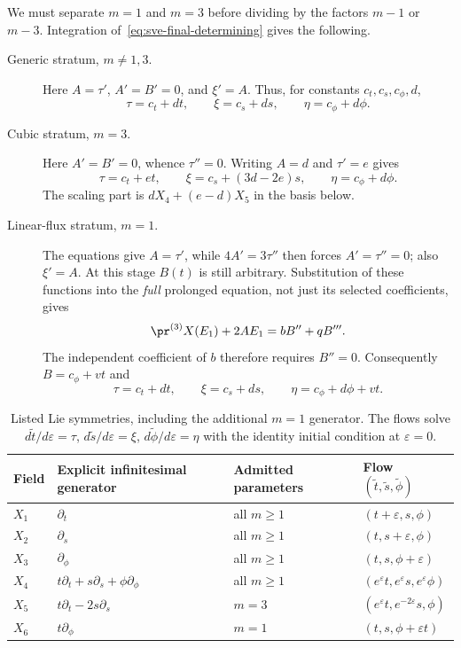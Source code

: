 We must separate $m=1$ and $m=3$ before dividing by the factors $m-1$ or
$m-3$. Integration of~\eqref{eq:sve-final-determining} gives the following.
\begin{description}
\item[Generic stratum, $m\ne1,3$.]
Here $A=\tau'$, $A'=B'=0$, and $\xi'=A$. Thus, for constants
$c_t,c_s,c_\phi,d$,
\[
 \tau=c_t+dt,\qquad \xi=c_s+ds,\qquad \eta=c_\phi+d\phi.
\]
\item[Cubic stratum, $m=3$.]
Here $A'=B'=0$, whence $\tau''=0$. Writing $A=d$ and $\tau'=e$
gives
\[
 \tau=c_t+et,\qquad \xi=c_s+(3d-2e)s,\qquad \eta=c_\phi+d\phi.
\]
The scaling part is $dX_4+(e-d)X_5$ in the basis below.
\item[Linear-flux stratum, $m=1$.]
The equations give $A=\tau'$, while $4A'=3\tau''$ then forces
$A'=\tau''=0$; also $\xi'=A$. At this stage $B(t)$ is still arbitrary.
Substitution of these functions into the \emph{full} prolonged equation,
not just its selected coefficients, gives
\[
 \pr^{(3)}X(E_1)+2A E_1=bB''+qB'''.
\]
The independent coefficient of $b$ therefore requires $B''=0$.
Consequently $B=c_\phi+vt$ and
\[
 \tau=c_t+dt,\qquad \xi=c_s+ds,\qquad
 \eta=c_\phi+d\phi+vt.
\]
\end{description}

\begin{table}[htbp]
\centering\small
\begin{tabularx}{\linewidth}{@{}lXll@{}}
\toprule
Field & Explicit infinitesimal generator & Admitted parameters & Flow $(\widetilde t,\widetilde s,\widetilde\phi)$\\
\midrule
$X_1$ & $\partial_t$ & all $m\geq1$ & $(t+\varepsilon,s,\phi)$\\
$X_2$ & $\partial_s$ & all $m\geq1$ & $(t,s+\varepsilon,\phi)$\\
$X_3$ & $\partial_\phi$ & all $m\geq1$ & $(t,s,\phi+\varepsilon)$\\
$X_4$ & $t\partial_t+s\partial_s+\phi\partial_\phi$ & all $m\geq1$ & $(e^\varepsilon t,e^\varepsilon s,e^\varepsilon\phi)$\\
$X_5$ & $t\partial_t-2s\partial_s$ & $m=3$ & $(e^\varepsilon t,e^{-2\varepsilon}s,\phi)$\\
$X_6$ & $t\partial_\phi$ & $m=1$ & $(t,s,\phi+\varepsilon t)$\\
\bottomrule
\end{tabularx}
\caption{Listed Lie symmetries, including the additional $m=1$ generator.
The flows solve $d\widetilde t/d\varepsilon=\tau$,
$d\widetilde s/d\varepsilon=\xi$, $d\widetilde\phi/d\varepsilon=\eta$
with the identity initial condition at $\varepsilon=0$.}
\label{tab:sve-generators}
\end{table}

